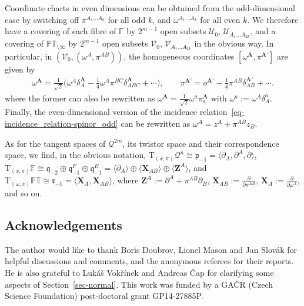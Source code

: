 \documentclass[pdftex]{sigma}
\numberwithin{equation}{section}
\newcommand{\parderv}[2] {\frac{\partial#1}{\partial#2}}
\newcommand{\mbf} [1]{\mathbf{#1}}
\newcommand{\mc} [1]{\mathcal{#1}}
\newcommand{\Tgt} {\mathrm{T}}
\newcommand{\mfp} {\mathfrak{p}}
\newcommand{\mfq} {\mathfrak{q}}
\newcommand{\mfr} {\mathfrak{r}}
\newcommand{\PT} {\mathbb{PT}}
\newcommand{\F} {\mathbb{F}}
\begin{document}
Coordinate charts in even dimensions can be obtained from the odd-dimensional case by switching of\/f $\pi^{A_1 \ldots A_{k}}$ for all odd $k$, and $\omega^{A_1 \ldots A_{k}}$ for all even $k$. We therefore have a covering of each f\/ibre of $\F$ by $2^{m-1}$ open subsets $\mc{U}_0$, $\mc{U}_{A_1 \ldots A_{2k}}$, and a covering of $\PT_{\setminus \widehat{\infty}}$ by $2^{m-1}$ open subsets $\mc{V}_0$, $\mc{V}_{A_1 \ldots A_{2k}}$ in the obvious way. In particular, in $(\mc{V}_0, (\omega^A , \pi^{AB} ))$, the homogeneous coordinates $[\omega^\mbf{A},\pi^{\mbf{A}'}]$ are given by
\begin{gather*}
\omega^\mbf{A} = \tfrac{1}{\sqrt{2}} \big( \omega^A \delta_A^\mbf{A} - \tfrac{1}{4} \omega^A \pi^{BC} \delta_{ABC}^\mbf{A} + \cdots \big) , \qquad
\pi^{\mbf{A}'} = o^{\mbf{A'}} - \tfrac{1}{4} \pi^{AB} \delta_{AB}^{\mbf{A'}} + \cdots .
\end{gather*}
where the former can also be rewritten as $\omega^\mbf{A} = \frac{1}{\sqrt{2}} \omega^a \pi_a^\mbf{A}$ with $\omega^a := \omega^A \delta_A^a$. Finally, the even-dimensional version of the incidence relation~\eqref{eq-incidence_relation-spinor_odd} can be rewritten as $\omega^A = z^A + \pi^{AB} z_B$.

As for the tangent spaces of $\mc{Q}^{2m}$, its twistor space and their correspondence space, we f\/ind, in the obvious notation, $\Tgt_{(x,\pi)} \mc{Q}^n \cong \mfp_{-1} = \langle \partial_{A} , \partial^{A} , \partial \rangle$, $\Tgt_{(x,\pi)} \F \cong \mfq_{-2} \oplus \mfq_{-1}^F \oplus \mfq_{-1}^E = \langle \partial_{A} \rangle \oplus \langle \bm{X}_{AB} \rangle \oplus \langle \bm{Z}^{A} \rangle$, and $\Tgt_{(\omega,\pi)} \PT \cong \mfr_{-1} = \langle \bm{X}_{A} , \bm{X}_{AB} \rangle$, where $\bm{Z} ^{A} := \partial ^{A} + \pi^{AB} \partial _B$, $\bm{X}_{AB} := \parderv{}{\pi^{AB}}$, $\bm{X}_{A} := \parderv{}{\omega^{A}}$, and so on.

\subsection*{Acknowledgements}
The author would like to thank Boris Doubrov, Lionel Mason and Jan Slov\'{a}k for helpful discussions and comments, and the anonymous referees for their reports. He is also grateful to Luk\'{a}\v{s} Vok\v{r}\'{i}nek and Andreas \v{C}ap for clarifying some aspects of Section~\ref{sec-normal}. This work was funded by a GA\v{C}R (Czech Science Foundation) post-doctoral grant GP14-27885P.
\end{document}
